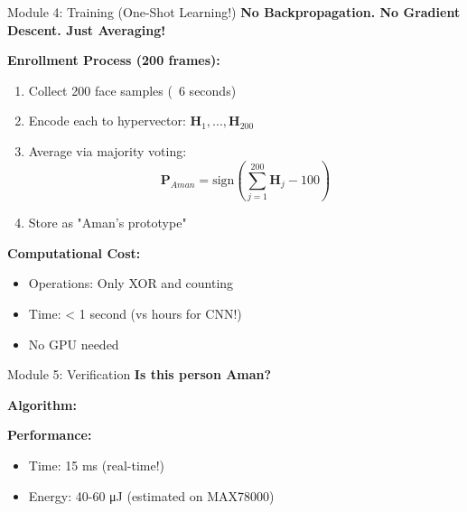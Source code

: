 \documentclass[aspectratio=169]{beamer}
\begin{document}
\begin{frame}{Module 4: Training (One-Shot Learning!)}
\textbf{No Backpropagation. No Gradient Descent. Just Averaging!}

\textbf{Enrollment Process (200 frames):}
\begin{enumerate}
    \item Collect 200 face samples (~6 seconds)
    \item Encode each to hypervector: $\mathbf{H}_1, ..., \mathbf{H}_{200}$
    \item Average via majority voting:
    \begin{equation*}
    \mathbf{P}_{Aman} = \text{sign}\left(\sum_{j=1}^{200} \mathbf{H}_j - 100\right)
    \end{equation*}
    \item Store as "Aman's prototype"
\end{enumerate}

\textbf{Computational Cost:} 
\begin{itemize}
    \item Operations: Only XOR and counting
    \item Time: < 1 second (vs hours for CNN!)
    \item No GPU needed
\end{itemize}
\end{frame}

\begin{frame}{Module 5: Verification}
\textbf{Is this person Aman?}

\textbf{Algorithm:}

\textbf{Performance:}
\begin{itemize}
    \item Time: 15 ms (real-time!)
    \item Energy: 40-60 μJ (estimated on MAX78000)
\end{itemize}
\end{frame}
\end{document}
